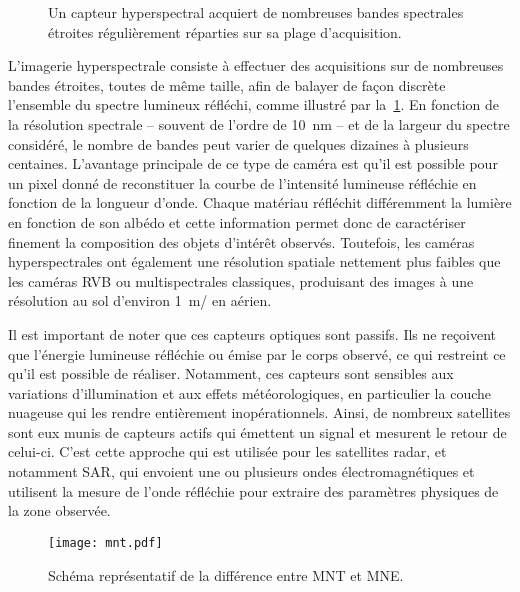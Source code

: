 \begin{figure}
  \resizebox{\textwidth}{!}{
  
  }
  \caption{Un capteur hyperspectral acquiert de nombreuses bandes spectrales étroites régulièrement réparties sur sa plage d'acquisition.}
  \label{fig:hyperspectral}
\end{figure}

L'imagerie hyperspectrale consiste à effectuer des acquisitions sur de nombreuses bandes étroites, toutes de même taille, afin de balayer de façon discrète l'ensemble du spectre lumineux réfléchi, comme illustré par la~\cref{fig:hyperspectral}. En fonction de la résolution spectrale -- souvent de l'ordre de \SI{10}{\nano\meter} -- et de la largeur du spectre considéré, le nombre de bandes peut varier de quelques dizaines à plusieurs centaines. L'avantage principale de ce type de caméra est qu'il est possible pour un pixel donné de reconstituer la courbe de l'intensité lumineuse réfléchie en fonction de la longueur d'onde. Chaque matériau réfléchit différemment la lumière en fonction de son albédo et cette information permet donc de caractériser finement la composition des objets d'intérêt observés. Toutefois, les caméras hyperspectrales ont également une résolution spatiale nettement plus faibles que les caméras \gls{RVB} ou multispectrales classiques, produisant des images à une résolution au sol d'environ \SI{1}{\meter/\px} en aérien.

Il est important de noter que ces capteurs optiques sont passifs. Ils ne reçoivent que l'énergie lumineuse réfléchie ou émise par le corps observé, ce qui restreint ce qu'il est possible de réaliser. Notamment, ces capteurs sont sensibles aux variations d'illumination et aux effets météorologiques, en particulier la couche nuageuse qui les rendre entièrement inopérationnels. Ainsi, de nombreux satellites sont eux munis de capteurs actifs qui émettent un signal et mesurent le retour de celui-ci. C'est cette approche qui est utilisée pour les satellites radar, et notamment \gls{SAR}, qui envoient une ou plusieurs ondes électromagnétiques et utilisent la mesure de l'onde réfléchie pour extraire des paramètres physiques de la zone observée.

\begin{figure}
  \texttt{[image: mnt.pdf]}
  \caption{Schéma représentatif de la différence entre \gls{MNT} et \gls{MNE}.}
  \label{fig:mnt}
\end{figure}

